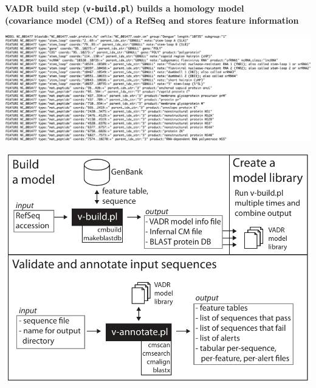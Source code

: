 \documentclass[landscape]{slides}
\begin{document}
\begin{slide}
\begin{center}
\textbf{VADR build step (\texttt{v-build.pl}) builds a homology model
  \\ (covariance model (CM)) of a RefSeq and stores feature information}

\includegraphics[width=10.5in]{figs/ss-001477-minfo}

\end{center}
\vfill
\end{slide}
\begin{slide}
\begin{center}

\includegraphics[width=10in]{figs/vadr}

\end{center}
\vfill
\end{slide}
\end{document}
